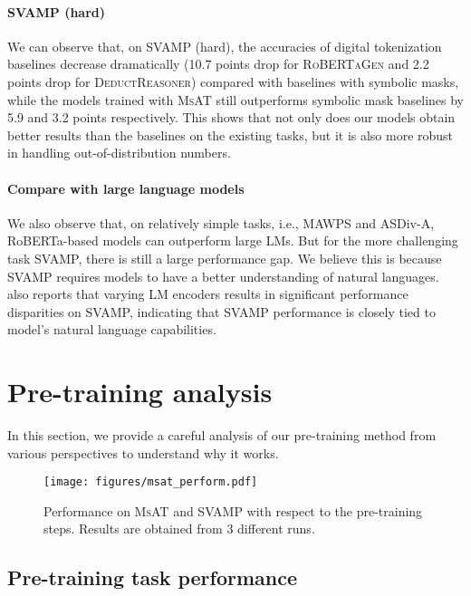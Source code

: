\documentclass[11pt]{article}
\begin{document}
    
    \paragraph{SVAMP (hard)} 
We can observe that, on SVAMP (hard), the accuracies of digital tokenization baselines decrease dramatically 
        (10.7 points drop for \textsc{RoBERTaGen} and 2.2 points drop for \textsc{DeductReasoner}) compared with baselines with symbolic masks, 
        while the models trained with \textsc{MsAT} still outperforms symbolic mask baselines by 5.9 and 3.2 points respectively. 
This shows that not only does our models obtain better results than the baselines on the existing tasks, 
        but it is also more robust in handling out-of-distribution numbers.


    
    \paragraph{Compare with large language models}      
We also observe that, on relatively simple tasks, i.e., MAWPS and ASDiv-A, 
        RoBERTa-based models can outperform large LMs.
But for the more challenging task SVAMP, there is still a large performance gap.
We believe this is because SVAMP requires models to have a better understanding of natural languages.
\citet{jie2022deductreason} also reports that varying LM encoders results in significant performance disparities on SVAMP, 
        indicating that SVAMP performance is closely tied to model's natural language capabilities.



  \section{Pre-training analysis}\label{sec:ablation}
    
    
    In this section, we provide a careful analysis of our pre-training method from various perspectives to understand why it works.
      

\begin{figure}[t]
  \captionsetup{type=figure}
  \centering
  \texttt{[image: figures/msat\_perform.pdf]}
\caption{
      \label{fig:inter_perform} 
      Performance on \textsc{MsAT} and SVAMP with respect to the pre-training steps.
Results are obtained from 3 different runs.
  }
\end{figure}


    \subsection{Pre-training task performance}\label{sec:pre_experiment}
\end{document}
